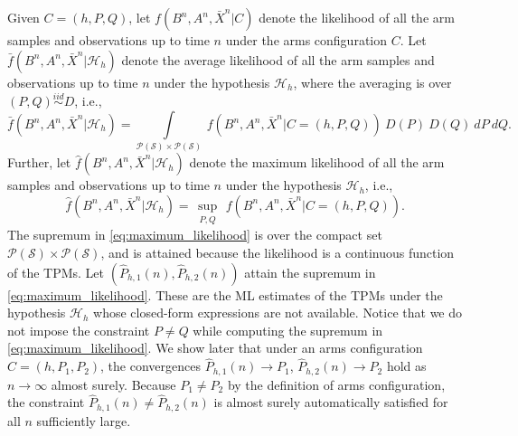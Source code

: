 Given $C=(h, P, Q)$, let $f(B^n, A^n, \bar{X}^n|C)$ denote the likelihood of all the arm samples and observations up to time $n$ under the arms configuration $C$. Let $\bar{f}(B^n, A^n, \bar{X}^n|\mathcal{H}_h)$ denote the average likelihood of all the arm samples and observations up to time $n$ under the hypothesis $\mathcal{H}_h$, where the averaging is over $(P, Q) \stackrel{iid}{\sim} D$, i.e., 
\begin{equation}
	\bar{f}(B^n, A^n, \bar{X}^n|\mathcal{H}_h) = \int\limits_{\mathscr{P}(\mathcal{S})\times \mathscr{P}(\mathcal{S})}~f(B^n, A^n, \bar{X}^n|C=(h, P, Q))~D(P)~D(Q)~dP~dQ.
	\label{eq:average_likelihood}
\end{equation}
Further, let $\hat{f}(B^n, A^n, \bar{X}^n|\mathcal{H}_h)$ denote the maximum likelihood of all the arm samples and observations up to time $n$ under the hypothesis $\mathcal{H}_h$, i.e.,
\begin{equation}
	\hat{f}(B^n, A^n, \bar{X}^n|\mathcal{H}_h)=\sup\limits_{\substack{P, Q}}~f(B^n, A^n, \bar{X}^n|C=(h, P, Q)).
	\label{eq:maximum_likelihood}
\end{equation}
{\color{black} The supremum in \eqref{eq:maximum_likelihood} is over the compact set $\mathscr{P}(\mathcal{S})\times\mathscr{P}(\mathcal{S})$, and is attained because the likelihood is a continuous function of the TPMs.}
Let $(\hat{P}_{h, 1}(n),\hat{P}_{h, 2}(n))$ attain the supremum in \eqref{eq:maximum_likelihood}. These are the ML estimates of the TPMs under the hypothesis $\mathcal{H}_h$ whose closed-form expressions are not available. 
{\color{black} Notice that we do not impose the constraint $P\neq Q$ while computing the supremum in \eqref{eq:maximum_likelihood}. We show later that under an arms configuration $C=(h, P_1, P_2)$, the convergences $\hat{P}_{h, 1}(n)\to P_1$, $\hat{P}_{h, 2}(n)\to P_2$ hold as $n\to \infty$ almost surely. Because $P_1\neq P_2$ by the definition of arms configuration, the constraint $\hat{P}_{h, 1}(n)\neq \hat{P}_{h, 2}(n)$ is almost surely automatically satisfied for all $n$ sufficiently large.}

